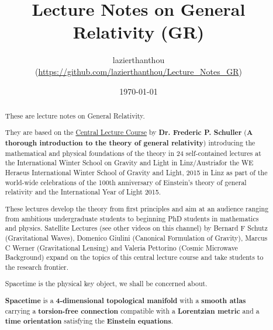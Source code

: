 \documentclass[10pt,a4paper,oneside]{article}
\theoremstyle{plain}
\theoremstyle{definition}
\theoremstyle{remark}
\numberwithin{equation}{section}
\begin{document}

\title{Lecture Notes on General Relativity (GR)}
\author{lazierthanthou \\ (\url{https://github.com/lazierthanthou/Lecture_Notes_GR})}
\date{\today}

\maketitle

\tableofcontents

\begin{abstract}
These are lecture notes on General Relativity.

They are based on the \href{https://www.youtube.com/channel/UCUHKG3S9N_QeIE2jQXd2-VQ/feed}{Central Lecture Course} by \textbf{Dr. Frederic P. Schuller} (\textbf{A thorough introduction to the theory of general relativity}) introducing the mathematical and physical foundations of the theory in 24 self-contained lectures at the International Winter School on Gravity and Light in Linz/Austriafor the WE Heraeus International Winter School of Gravity and Light, 2015 in Linz as part of the world-wide celebrations of the 100th anniversary of Einstein's theory of general relativity and the International Year of Light 2015.

These lectures develop the theory from first principles and aim at an audience ranging from ambitious undergraduate students to beginning PhD students in mathematics and physics. Satellite Lectures (see other videos on this channel) by Bernard F Schutz (Gravitational Waves), Domenico Giulini (Canonical Formulation of Gravity), Marcus C Werner (Gravitational Lensing) and Valeria Pettorino (Cosmic Microwave Background) expand on the topics of this central lecture course and take students to the research frontier.

Spacetime is the physical key object, we shall be concerned about.

\begin{framed}
\textbf{Spacetime} is a \textbf{4-dimensional topological manifold} with a \textbf{smooth atlas} carrying a \textbf{torsion-free connection} compatible with a \textbf{Lorentzian metric} and a \textbf{time orientation} satisfying the \textbf{Einstein equations}.
\end{framed}

\end{abstract}
\end{document}

